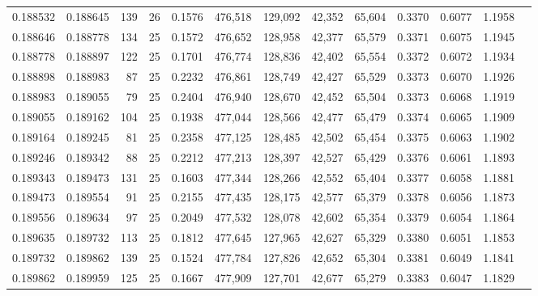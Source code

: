 \begin{tabular}{rrrrrrrrrrrrr}
0.188532 & 0.188645 &   139 &  26 &                                     0.1576 & 476,518 & 129,092 &  42,352 &  65,604 & 0.3370 & 0.6077 & 1.1958 \\
0.188646 & 0.188778 &   134 &  25 &                                     0.1572 & 476,652 & 128,958 &  42,377 &  65,579 & 0.3371 & 0.6075 & 1.1945 \\
0.188778 & 0.188897 &   122 &  25 &                                     0.1701 & 476,774 & 128,836 &  42,402 &  65,554 & 0.3372 & 0.6072 & 1.1934 \\
0.188898 & 0.188983 &    87 &  25 &                                     0.2232 & 476,861 & 128,749 &  42,427 &  65,529 & 0.3373 & 0.6070 & 1.1926 \\
0.188983 & 0.189055 &    79 &  25 &                                     0.2404 & 476,940 & 128,670 &  42,452 &  65,504 & 0.3373 & 0.6068 & 1.1919 \\
0.189055 & 0.189162 &   104 &  25 &                                     0.1938 & 477,044 & 128,566 &  42,477 &  65,479 & 0.3374 & 0.6065 & 1.1909 \\
0.189164 & 0.189245 &    81 &  25 &                                     0.2358 & 477,125 & 128,485 &  42,502 &  65,454 & 0.3375 & 0.6063 & 1.1902 \\
0.189246 & 0.189342 &    88 &  25 &                                     0.2212 & 477,213 & 128,397 &  42,527 &  65,429 & 0.3376 & 0.6061 & 1.1893 \\
0.189343 & 0.189473 &   131 &  25 &                                     0.1603 & 477,344 & 128,266 &  42,552 &  65,404 & 0.3377 & 0.6058 & 1.1881 \\
0.189473 & 0.189554 &    91 &  25 &                                     0.2155 & 477,435 & 128,175 &  42,577 &  65,379 & 0.3378 & 0.6056 & 1.1873 \\
0.189556 & 0.189634 &    97 &  25 &                                     0.2049 & 477,532 & 128,078 &  42,602 &  65,354 & 0.3379 & 0.6054 & 1.1864 \\
0.189635 & 0.189732 &   113 &  25 &                                     0.1812 & 477,645 & 127,965 &  42,627 &  65,329 & 0.3380 & 0.6051 & 1.1853 \\
0.189732 & 0.189862 &   139 &  25 &                                     0.1524 & 477,784 & 127,826 &  42,652 &  65,304 & 0.3381 & 0.6049 & 1.1841 \\
0.189862 & 0.189959 &   125 &  25 &                                     0.1667 & 477,909 & 127,701 &  42,677 &  65,279 & 0.3383 & 0.6047 & 1.1829 \\

\end{tabular}
